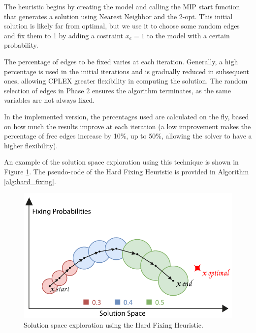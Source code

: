 The heuristic begins by creating the model and calling the MIP start function that generates a solution using Nearest Neighbor and the 2-opt. This initial solution is likely far from optimal, but we use it to choose some random edges and fix them to 1 by adding a costraint \(x_e=1 \) to the model with a certain probability.

The percentage of edges to be fixed varies at each iteration. Generally, a high percentage is used in the initial iterations and is gradually reduced in subsequent ones, allowing CPLEX greater flexibility in computing the solution. The random selection of edges in Phase 2 ensures the algorithm terminates, as the same variables are not always fixed.

In the implemented version, the percentages used are calculated on the fly, based on how much the results improve at each iteration (a low improvement makes the percentage of free edges increase by 10\%, up to 50\%, allowing the solver to have a higher flexibility).

An example of the solution space exploration using this technique is shown in Figure \ref{fig:hrd_fix}. The pseudo-code of the Hard Fixing Heuristic is provided in Algorithm \ref{alg:hard_fixing}.

\begin{figure}[H]
    \centering
    \includegraphics[width=0.8\linewidth]{Immagini/hrd_fix.pdf}
    \caption{Solution space exploration using the Hard Fixing Heuristic.}
    \label{fig:hrd_fix}
\end{figure}

